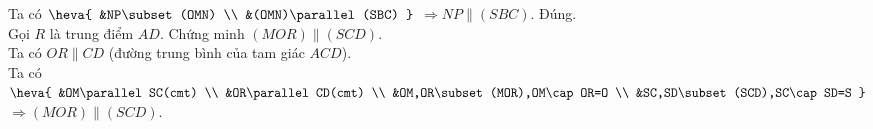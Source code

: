 \begin{ex}
{\begin{itemchoice}
			Ta  có $\heva{
			&NP\subset (OMN)  \\
			&(OMN)\parallel (SBC) } $ $\Rightarrow  NP\parallel (SBC)$.
			 \itemch Đúng.\\
			Gọi $R$ là trung điểm $AD$. Chứng minh  $(MOR)\parallel (SCD)$.\\
			Ta có $OR\parallel CD$ (đường trung bình của  tam giác $ACD$).\\
			Ta có  $\heva{
			 &OM\parallel SC(cmt) \\
			&OR\parallel CD(cmt)  \\
			 &OM,OR\subset (MOR),OM\cap OR=O \\
			&SC,SD\subset (SCD),SC\cap SD=S } $  $\Rightarrow (MOR)\parallel (SCD)$.
		\end{itemchoice}
	} 
\end{ex}

